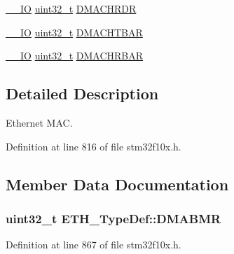 \begin{DoxyCompactItemize}
\item 
\hyperlink{group___c_m_s_i_s___c_m3__core__definitions_gaec43007d9998a0a0e01faede4133d6be}{\+\_\+\+\_\+\+IO} \hyperlink{_p_e___types_8h_a33594304e786b158f3fb30289278f5af}{uint32\+\_\+t} \hyperlink{struct_e_t_h___type_def_ab4a222f725cc43952993519b20466637}{D\+M\+A\+C\+H\+R\+DR}
\item 
\hyperlink{group___c_m_s_i_s___c_m3__core__definitions_gaec43007d9998a0a0e01faede4133d6be}{\+\_\+\+\_\+\+IO} \hyperlink{_p_e___types_8h_a33594304e786b158f3fb30289278f5af}{uint32\+\_\+t} \hyperlink{struct_e_t_h___type_def_abb2eba5ee2a1621abeeb59e3aadc0318}{D\+M\+A\+C\+H\+T\+B\+AR}
\item 
\hyperlink{group___c_m_s_i_s___c_m3__core__definitions_gaec43007d9998a0a0e01faede4133d6be}{\+\_\+\+\_\+\+IO} \hyperlink{_p_e___types_8h_a33594304e786b158f3fb30289278f5af}{uint32\+\_\+t} \hyperlink{struct_e_t_h___type_def_a03160db5ffae457bab55c0358c4ef998}{D\+M\+A\+C\+H\+R\+B\+AR}
\end{DoxyCompactItemize}


\subsection{Detailed Description}
Ethernet M\+AC. 

Definition at line 816 of file stm32f10x.\+h.



\subsection{Member Data Documentation}
\subsubsection[{\texorpdfstring{D\+M\+A\+B\+MR}{DMABMR}}]{ {\bf uint32\+\_\+t} E\+T\+H\+\_\+\+Type\+Def\+::\+D\+M\+A\+B\+MR}\hypertarget{struct_e_t_h___type_def_a32b1c260b8ab0b3f67cbfa97f4d910d1}{}\label{struct_e_t_h___type_def_a32b1c260b8ab0b3f67cbfa97f4d910d1}


Definition at line 867 of file stm32f10x.\+h.

